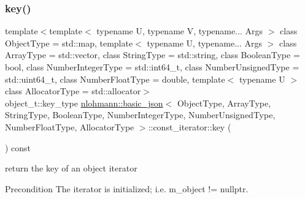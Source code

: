 \subsubsection{\texorpdfstring{key()}{key()}}
{\footnotesize\ttfamily template$<$template$<$ typename U, typename V, typename... Args $>$ class Object\+Type = std\+::map, template$<$ typename U, typename... Args $>$ class Array\+Type = std\+::vector, class String\+Type  = std\+::string, class Boolean\+Type  = bool, class Number\+Integer\+Type  = std\+::int64\+\_\+t, class Number\+Unsigned\+Type  = std\+::uint64\+\_\+t, class Number\+Float\+Type  = double, template$<$ typename U $>$ class Allocator\+Type = std\+::allocator$>$ \\
object\+\_\+t\+::key\+\_\+type \hyperlink{classnlohmann_1_1basic__json}{nlohmann\+::basic\+\_\+json}$<$ Object\+Type, Array\+Type, String\+Type, Boolean\+Type, Number\+Integer\+Type, Number\+Unsigned\+Type, Number\+Float\+Type, Allocator\+Type $>$\+::const\+\_\+iterator\+::key (\begin{DoxyParamCaption}{ }\end{DoxyParamCaption}) const\hspace{0.3cm}{\ttfamily [inline]}}



return the key of an object iterator 

\begin{DoxyPrecond}{Precondition}
The iterator is initialized; i.\+e. {\ttfamily m\+\_\+object != nullptr}. 
\end{DoxyPrecond}
\mbox{\label{classnlohmann_1_1basic__json_1_1const__iterator_a2defc155f17e8325747d2f884bb60eab}} 

